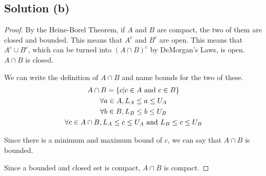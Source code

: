 \documentclass[12pt]{report}
\begin{document}
    \subsection{Solution (b)}
        \begin{proof}
            By the Heine-Borel Theorem, if $A$ and $B$ are compact, the two of them are closed and bounded.
            This means that $A^c$ and $B^c$ are open.
            This means that $A^c \cup B^c$, which can be turned into $(A \cap B)^c$ by DeMorgan's Laws, is open.
            $A \cap B$ is closed.

            We can write the definition of $A \cap B$ and name bounds for the two of these.
            \begin{gather}
                A \cap B = \left\{ c \vert c \in A \text{ and } c \in B \right\}\\
                \forall a \in A, L_A \leq a \leq U_A\\
                \forall b \in B, L_B \leq b \leq U_B\\
                \forall c \in A \cap B, L_A \leq c \leq U_A \text{ and } L_B \leq c \leq U_B
            \end{gather}

            Since there is a minimum and maximum bound of $c$, we can say that $A \cap B$ is bounded. 


            Since a bounded and closed set is compact, $A \cap B$ is compact.
        \end{proof}
\end{document}
